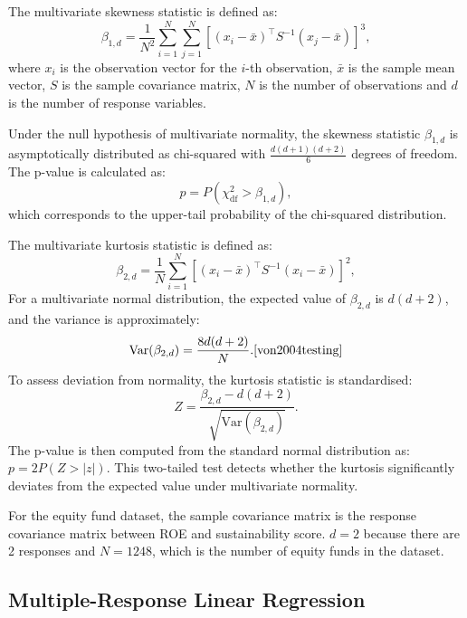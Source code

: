 \documentclass[11pt]{report} %
\begin{document}
The multivariate skewness statistic is defined as:
\[
\beta_{1,d} = \frac{1}{N^2} \sum_{i=1}^{N} \sum_{j=1}^{N} \left[ (x_i - \bar{x})^\top S^{-1} (x_j - \bar{x}) \right]^3,
\]
where \( x_i \) is the observation vector for the \( i \)-th observation, \( \bar{x} \) is the sample mean vector, \( S \) is the sample covariance matrix, \( N \) is the number of observations and \( d \) is the number of response variables.\cite{von2004testing}

Under the null hypothesis of multivariate normality, the skewness statistic \( \beta_{1,d} \) is asymptotically distributed as chi-squared with \( \frac{d(d+1)(d+2)}{6} \) degrees of freedom.\cite{von2004testing}
The p-value is calculated as:
\[
p = P\left( \chi^2_{\text{df}} > \beta_{1,d} \right),
\]
which corresponds to the upper-tail probability of the chi-squared distribution.


The multivariate kurtosis statistic is defined as:
\[
\beta_{2,d} = \frac{1}{N} \sum_{i=1}^{N} \left[ (x_i - \bar{x})^\top S^{-1} (x_i - \bar{x}) \right]^2,
\]
For a multivariate normal distribution, the expected value of \( \beta_{2,d} \) is \( d(d+2) \), and the variance is approximately:
\[
\text{Var}(\beta_{2,d}) = \frac{8d(d+2)}{N}.\cite{von2004testing}
\]
To assess deviation from normality, the kurtosis statistic is standardised:
\[
Z = \frac{\beta_{2,d} - d(d + 2)}{\sqrt{\text{Var}(\beta_{2,d})}}.
\]
The p-value is then computed from the standard normal distribution as:
\(
p = 2P(Z > |z|).
\)
This two-tailed test detects whether the kurtosis significantly deviates from the expected value under multivariate normality.

For the equity fund dataset, the sample covariance matrix is the response covariance matrix between ROE and sustainability score. $d=2$ because there are 2 responses and $N=1248$, which is the number of equity funds in the dataset.


\subsection{Multiple-Response Linear Regression}
\end{document}
